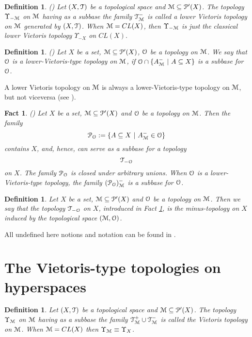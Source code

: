 \documentclass[12pt,draft,leqno]{article}
\newtheorem{defi}[theorem]{Definition}
\newtheorem{fact}[theorem]{Fact}
\def\UP{\Upsilon}
\def\ap{^\prime}
\def\st{\ |\ }
\def\MM{{\cal M}}
\def\OO{{\cal O}}
\def\PP{{\cal P}}
\def\TT{{\cal T}}
\begin{document}
\begin{defi}\label{LVT}{\rm (\cite{ED})}
\rm
Let $(X,\TT)$ be a topological space and $\MM\subseteq\PP\ap(X)$. The topology $\UP_{-\MM}$ on $\MM$ having as a subbase the family $\TT_{\MM}^-$ is called a {\em lower Vietoris topology on} $\MM$ generated by $(X,\TT)$. When $\MM=CL(X)$, then $\UP_{-\MM}$ is just the classical lower Vietoris topology $\UP_{-X}$ on $CL(X)$.
\end{defi}

\begin{defi}\label{lower-Vietoris-type}{\rm (\cite{ED})}
\rm
Let $X$ be a set, $\MM\subseteq\PP\ap(X)$, $\OO$ be a topology on $\MM$. We say that $\OO$ is a {\em lower-Vietoris-type topology on} $\MM$, if $\OO\cap\{A^-_{\MM}\st A\subseteq X\}$ is a subbase for $\OO$.
\end{defi}

A lower Vietoris topology on $\MM$ is always a lower-Vietoris-type topology on $\MM$, but not viceversa (see \cite{ED}).

\begin{fact}\label{Vietoris-type}{\rm (\cite{ED})}
\rm
Let $X$ be a set, $\MM\subseteq\PP\ap(X)$ and $\OO$ be a topology on $\MM$. Then the family $$\PP_{\OO}:=\{A\subseteq X\st A_{\MM}^-\in\OO\}$$ contains $X$, and, hence, can serve as a subbase for a topology $$\TT_{-\OO}$$ on $X$. The family $\PP_{\OO}$ is closed under arbitrary unions. When $\OO$ is a lower-Vietoris-type topology, the family $(\PP_{\OO})_{\MM}^-$ is a subbase for $\OO$.
\end{fact}

\begin{defi}\label{2.5}
\rm
Let $X$ be a set, $\MM\subseteq\PP\ap(X)$ and $\OO$ be a topology on $\MM$. Then we  say that the topology $\TT_{-\OO}$ on $X$, introduced in Fact \ref{Vietoris-type}, is {\em the minus-topology on $X$ induced by the topological space} $(\MM,\OO)$.
\end{defi}


All undefined here notions and notation can be found in \cite{AP,E2}.


\section{The Vietoris-type topologies on hyperspaces}

\begin{defi}\label{Vie}
\rm
Let $(X,\TT)$ be a topological space and $\MM\subseteq\PP\ap(X)$. The topology $\UP_{\MM}$ on $\MM$ having as a subbase the family $\TT_{\MM}^+\cup\TT_{\MM}^-$ is called {\em the Vietoris topology on} $\MM$. When $\MM=CL(X)$ then $\UP_{\MM}\equiv\UP_X$.
\end{defi}
\end{document}
